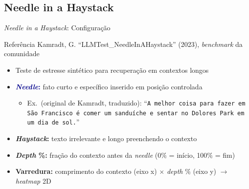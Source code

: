 \documentclass[aspectratio=169, xcolor=dvipsnames]{beamer}
\begin{document}
  \subsection{Needle in a Haystack}

  \begin{frame}{\textit{Needle in a Haystack}: Configuração}
    \begin{exampleblock}{Referência}
      Kamradt, G. ``LLMTest\_NeedleInAHaystack'' (2023), \textit{benchmark} da comunidade
    \end{exampleblock}

    \begin{itemize}
      \item Teste de estresse sintético para recuperação em contextos longos
      \item \textcolor{DarkBlue}{\textbf{\textit{Needle}:}} fato curto e específico inserido em posição controlada
        \begin{itemize}
          \item Ex.\ (original de Kamradt, traduzido): ``\texttt{A melhor coisa para fazer em São Francisco é comer um sanduíche e sentar no Dolores Park em um dia de sol.}''
        \end{itemize}
      \item \textbf{\textit{Haystack}:} texto irrelevante e longo preenchendo o contexto
      \item \textbf{\textit{Depth} \%:} fração do contexto antes da \textit{needle} (0\% = início, 100\% = fim)
      \item \textbf{Varredura:} comprimento do contexto (eixo x) $\times$ \textit{depth} \% (eixo y) $\to$ \textit{heatmap} 2D
    \end{itemize}
  \end{frame}
\end{document}
